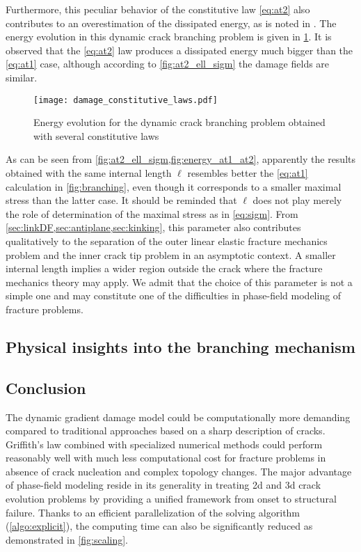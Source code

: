 Furthermore, this peculiar behavior of the constitutive law \eqref{eq:at2} also contributes to an overestimation of the dissipated energy, as is noted in \cite{BordenVerhooselScottHughesLandis:2012,VignolletMayBorstVerhoosel:2014}. The energy evolution in this dynamic crack branching problem is given in \cref{fig:energy_at1_at2}. It is observed that the \eqref{eq:at2} law produces a dissipated energy much bigger than the \eqref{eq:at1} case, although according to \cref{fig:at2_ell_sigm} the damage fields are similar.
\begin{figure}[htbp]
\centering
\texttt{[image: damage\_constitutive\_laws.pdf]}
\caption{Energy evolution for the dynamic crack branching problem obtained with several constitutive laws} \label{fig:energy_at1_at2}
\end{figure}

As can be seen from \cref{fig:at2_ell_sigm,fig:energy_at1_at2}, apparently the results obtained with the same internal length $\ell$ resembles better the \eqref{eq:at1} calculation in \cref{fig:branching}, even though it corresponds to a smaller maximal stress than the latter case. It should be reminded that $\ell$ does not play merely the role of determination of the maximal stress as in \eqref{eq:sigm}. From \cref{sec:linkDF,sec:antiplane,sec:kinking}, this parameter also contributes qualitatively to the separation of the outer linear elastic fracture mechanics problem and the inner crack tip problem in an asymptotic context. A smaller internal length implies a wider region outside the crack where the fracture mechanics theory may apply. We admit that the choice of this parameter is not a simple one and may constitute one of the difficulties in phase-field modeling of fracture problems.

\subsection{Physical insights into the branching mechanism} \label{sec:microbrachingstu}

\subsection*{Conclusion}
The dynamic gradient damage model could be computationally more demanding compared to traditional approaches based on a sharp description of cracks. Griffith's law combined with specialized numerical methods could perform reasonably well with much less computational cost for fracture problems in absence of crack nucleation and complex topology changes. The major advantage of phase-field modeling reside in its generality in treating 2d and 3d crack evolution problems by providing a unified framework from onset to structural failure. Thanks to an efficient parallelization of the solving algorithm (\cref{algo:explicit}), the computing time can also be significantly reduced as demonstrated in \cref{fig:scaling}.

